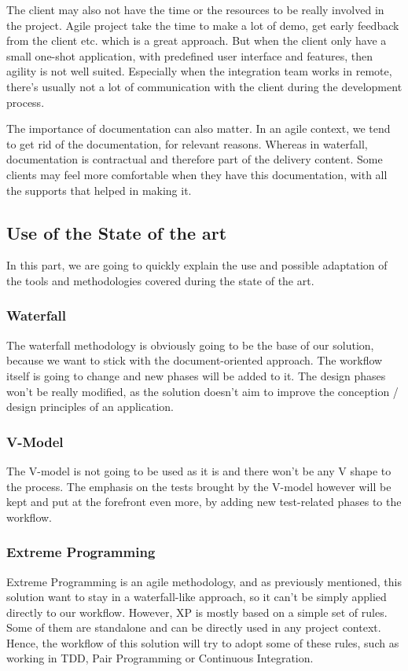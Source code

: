 The client may also not have the time or the resources to be really involved
in the project.
Agile project take the time to make a lot of demo, get early feedback from
the client etc.
which is a great approach.
But when the client only have a small one-shot application, with predefined
user interface and features, then agility is not well suited.
Especially when the integration team works in remote, there's usually not a
lot of communication with the client during the development process.

The importance of documentation can also matter.
In an agile context, we tend to get rid of the documentation, for relevant
reasons.
Whereas in waterfall, documentation is contractual and therefore part of the
delivery content.
Some clients may feel more comfortable when they have this documentation,
with all the supports that helped in making it.

\subsection{Use of the State of the art}\label{subsec:use-of-the-state-of-the-art}

In this part, we are going to quickly explain the use and possible adaptation
of the tools and methodologies covered during the state of the art.

\subsubsection{Waterfall}
The waterfall methodology is obviously going to be the base of our solution,
because we want to stick with the document-oriented approach.
The workflow itself is going to change and new phases will be added to it.
The design phases won't be really modified, as the solution doesn't aim to
improve the conception / design principles of an application.

\subsubsection{V-Model}
The V-model is not going to be used as it is and there won't be any V shape
to the process.
The emphasis on the tests brought by the V-model however will be kept and
put at the forefront even more, by adding new test-related phases to the
workflow.

\subsubsection{Extreme Programming}
Extreme Programming is an agile methodology, and as previously mentioned,
this solution want to stay in a waterfall-like approach, so it can't be
simply applied directly to our workflow.
However, XP is mostly based on a simple set of rules.
Some of them are standalone and can be directly used in any project context.
Hence, the workflow of this solution will try to adopt some of these rules,
such as working in TDD, Pair Programming or Continuous Integration.

